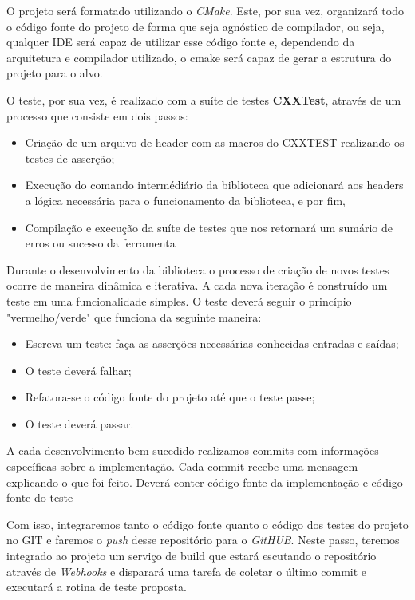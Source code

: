 \documentclass[
	article,			%
	12pt,				%
	oneside,			%
	a4paper,			%
	english,			
	brazil,
	sumario=tradicional
	]{abntex2}
\begin{document}
O projeto será formatado utilizando o \textit{CMake}. Este, por sua vez, organizará todo o código fonte do projeto de forma que seja agnóstico de compilador, ou seja, qualquer IDE será capaz de utilizar esse código fonte e, dependendo da arquitetura e compilador utilizado, o cmake será capaz de gerar a estrutura do projeto para o alvo. 

O teste, por sua vez, é realizado com a suíte de testes \textbf{CXXTest}, através de um processo que consiste em dois passos:

\begin{itemize}
	\item{Criação de um arquivo de header com as macros do CXXTEST realizando os testes de asserção;}
	\item{Execução do comando intermédiário da biblioteca que adicionará aos headers a lógica necessária para o funcionamento da biblioteca, e por fim,}
	\item{Compilação e execução da suíte de testes que nos retornará um sumário de erros ou sucesso da ferramenta}
\end{itemize}

Durante o desenvolvimento da biblioteca o processo de criação de novos testes ocorre de maneira dinâmica e iterativa. A cada nova iteração é construído um teste em uma funcionalidade simples. 
O teste deverá seguir o princípio "vermelho/verde" que funciona da seguinte maneira:
\begin{itemize}
	\item{Escreva um teste: faça as asserções necessárias conhecidas entradas e saídas;}
	\item{O teste deverá falhar;}	
	\item{Refatora-se o código fonte do projeto até que o teste passe;}
	\item{O teste deverá passar.}
\end{itemize}

A cada desenvolvimento bem sucedido realizamos commits com informações específicas sobre a implementação. Cada commit recebe uma mensagem explicando o que foi feito. Deverá conter código fonte da implementação e código fonte do teste

Com isso, integraremos tanto o código fonte quanto o código dos testes do projeto no GIT e faremos o \textit{push} desse repositório para o \textit{GitHUB}. Neste passo, teremos integrado ao projeto um serviço de build que estará escutando o repositório através de \textit{Webhooks} e disparará uma tarefa de coletar o último commit e executará a rotina de teste proposta.
\end{document}
